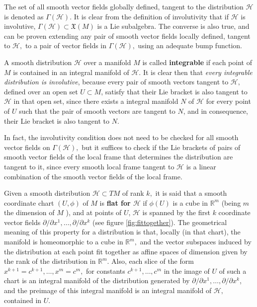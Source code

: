 \documentclass[12pt, letterpaper, reqno]{amsart}
\theoremstyle{definition}
\theoremstyle{plain}
\theoremstyle{remark}
\begin{document}
The set of all smooth vector fields  globally defined, tangent to the distribution $ \mathcal{H} $ is denoted as $ \Gamma( \mathcal{H}) $. It is clear from the definition of involutivity that if $ \mathcal{H} $ is involutive, $ \Gamma (\mathcal{H})\subset \mathfrak{X}(M) $ is a Lie subalgebra. The converse is also true, and can be proven extending any pair of smooth vector fields locally defined, tangent to $ \mathcal{H} ,$ to a pair of vector fields in $ \Gamma( \mathcal{H}), $ using an adequate bump function. 

A smooth distribution $ \mathcal{H} $ over a manifold $ M $ is called \textbf{integrable} if each point of $ M $ is contained in an integral manifold of $ \mathcal{H}. $  It is clear then that \textit{every integrable distribution is involutive}, because every pair of smooth vectors tangent to $ \mathcal{H}, $ defined over an open set $ U\subset M $, satisfy that their Lie bracket is also tangent to $ \mathcal{H} $ in that open set, since there exists a integral manifold $ N $  of $ \mathcal{H} $ for every point of $ U $ such that the pair of smooth vectors are tangent to $ N $, and in consequence, their Lie bracket is also tangent to $ N. $  

In fact, the involutivity condition does not need to be checked for all smooth vector fields on $ \Gamma( \mathcal{H}), $ but it suffices to check if the Lie brackets of pairs of smooth vector fields of the local frame that determines the distribution are tangent to it, since every smooth local frame tangent to $ \mathcal{H} $ is a linear combination of the smooth vector fields of the local frame. 

Given a smooth distribution $ \mathcal{H}\subset TM $  of rank $ k, $ it is said that a smooth coordinate chart $ (U,\phi) $ of $ M $ is \textbf{flat for $ \mathcal{H} $ } if $ \phi(U) $ is a cube in $ \mathbb{R}^m  $ (being $ m $ the dimension of $ M $ ), and at points of $ U $, $ \mathcal{H} $ is spanned by the first $ k $ coordinate vector fields $ \partial/\partial x^1,\dots,\partial/\partial x^k $ (see figure \ref{fig:fittogether}). The geometrical meaning of this property for a distribution is that, locally (in that chart), the manifold is homeomorphic to a cube in $ \mathbb{R}^m,  $ and the vector subspaces induced by the distribution at each point fit together as affine spaces of dimension given by the rank of the distribution in $ \mathbb{R}^m $. Also, each slice of the form $ x^{k+1}=c^{k+1},\dots, x^m=c^m,$ for constants $ c^{k+1}, \dots, c^m $ in the image of $ U $ of such a chart is an integral manifold of the distribution generated by $ \partial/\partial x^1,\dots,\partial/\partial x^k $, and the preimage of this integral manifold is an integral manifold of $ \mathcal{H}, $ contained in $ U. $  
\end{document}
